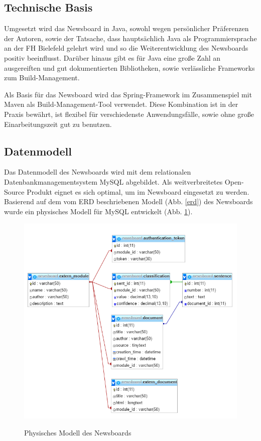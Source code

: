 \subsection{Technische Basis}
Umgesetzt wird das Newsboard in Java, sowohl wegen persönlicher Präferenzen der Autoren,
sowie der Tatsache, dass hauptsächlich Java als Programmiersprache
an der FH Bielefeld gelehrt wird und so die Weiterentwicklung des Newsboards
positiv beeinflusst. Darüber hinaus gibt es für Java eine große Zahl an ausgereiften
und gut dokumentierten Bibliotheken, sowie verlässliche Frameworks zum 
Build-Management.

Als Basis für das Newsboard wird das Spring-Framework im Zusammenspiel mit Maven
als Build-Management-Tool verwendet. Diese Kombination ist in der Praxis bewährt,
ist flexibel für verschiedenste Anwendungsfälle, sowie ohne große Einarbeitungszeit
gut zu benutzen.

\subsection{Datenmodell}
Das Datenmodell des Newsboards wird mit dem relationalen Datenbankmanagementsystem MySQL
abgebildet. Als weitverbreitetes Open-Source Produkt eignet es sich optimal, um im
Newsboard eingesetzt zu werden. Basierend auf dem vom ERD beschriebenen Modell
(Abb. \ref{erd}) des Newsboards wurde ein physisches Modell für MySQL entwickelt
(Abb. \ref{physical_model}).

\begin{figure}[h]
	\centering
	\includegraphics[scale=0.8]{content/physical-model.png}
	\label{physical_model}
	\caption{Physisches Modell des Newsboards}
\end{figure}

